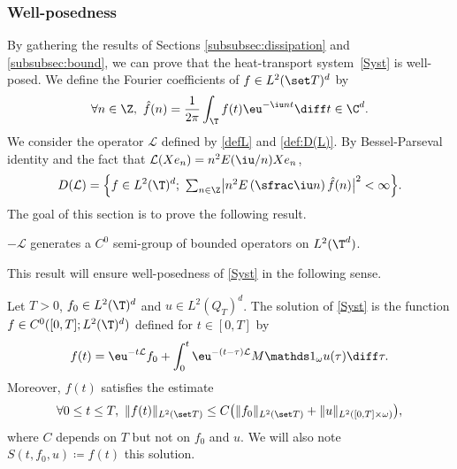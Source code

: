\subsubsection{Well-posedness}\label{sec:wp}
By gathering the results of Sections \ref{subsubsec:dissipation} and \ref{subsubsec:bound}, we can prove that the heat-transport system~\eqref{Syst} is well-posed.
We define the Fourier coefficients of $f\in L^2(\set T)^d$ by
\[
\forall n \in \Z, \ \hat{f}(n)=\frac1{2\pi}\int_{\T} f(t) \eu^{-\iu nt} \diff t \in \C^d.
\]
We consider the operator $\mathcal{L}$ defined by \eqref{defL} and \eqref{def:D(L)}. By Bessel-Parseval identity and the fact that $\mathcal L(Xe_n) = n^2E(\iu/n)X e_n$,
\begin{equation}\label{D(L)_BIS}
D(\mathcal{L})=\Big\{ f \in L^2(\T)^d;\
\textstyle\sum_{n\in\Z} \bigl\lvert n^2 E\left(\sfrac\iu n\right) \hat{f}(n)\bigr\rvert^2
< \infty \Big\}.
\end{equation}
The goal of this section is to prove the following result.

\begin{prop} \label{Prop:C0_sg}
$-\mathcal{L}$ generates a $C^0$ semi-group of bounded operators on $L^2(\T^d)$.
\end{prop}

This result will ensure well-posedness of \eqref{Syst} in the following sense.

\begin{definition}\label{def:solution}
Let $T>0$, $f_0 \in L^2(\T)^{d}$ and $u \in L^2(Q_T)^{d}$.
The solution of \eqref{Syst} is the function $f \in C^0([0,T];L^2(\T)^d)$ defined for $t\in [0,T]$ by
\[
f(t)=\eu^{-t\mathcal{L}} f_0+ \int_0^t \eu^{-(t-\tau)\mathcal{L}} M\mathds 1_\omega u(\tau) \diff\tau.
\]
Moreover, $f(t)$ satisfies the estimate
\begin{equation} \label{WP_estim}
\forall 0\leq t\leq T,\ \lVert f(t)\rVert_{L^2(\set T)}\leq C\big(\lVert f_0\rVert_{L^2(\set T)} + \lVert u\rVert_{L^2([0,T]\times\omega)}\big),
\end{equation}
where $C$ depends on $T$ but not on $f_0$ and $u$. We will also note $S(t,f_0,u) \coloneqq f(t)$ this solution.
\end{definition}

